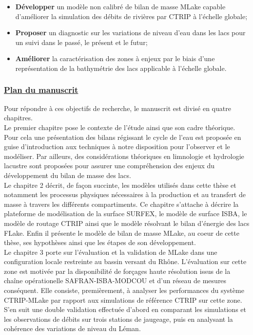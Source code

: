 \begin{itemize}
\item \textbf{Développer} un modèle non calibré de bilan de masse MLake capable d'améliorer la simulation des débits de rivières par CTRIP à l'échelle globale;\\

\item \textbf{Proposer} un diagnostic sur les variations de niveau d'eau dans les lacs pour un suivi dans le passé, le présent et le futur;\\

\item \textbf{Améliorer} la caractérisation des zones à enjeux par le biais d'une représentation de la bathymétrie des lacs applicable à l'échelle globale.\\
\end{itemize}

\subsubsection*{\underline{{\selectfont Plan du manuscrit}}}

\noindent Pour répondre à ces objectifs de recherche, le manuscrit est divisé en quatre chapitres. \\

Le premier chapitre pose le contexte de l'étude ainsi que son cadre théorique. Pour cela une présentation des bilans régissant le cycle de l'eau est proposée en guise d'introduction aux techniques à notre disposition pour l'observer et le modéliser. Par ailleurs, des considérations théoriques en limnologie et hydrologie lacustre sont proposées pour assurer une compréhension des enjeux du développement du bilan de masse des lacs. \\

Le chapitre 2 décrit, de façon succinte, les modèles utilisés dans cette thèse et notamment les processus physiques nécessaires à la production et au transfert de masse à travers les différents compartiments. Ce chapitre s'attache à décrire la plateforme de modélisation de la surface SURFEX, le modèle de surface ISBA, le modèle de routage CTRIP ainsi que le modèle résolvant le bilan d'énergie des lacs FLake. Enfin il présente le modèle de bilan de masse MLake, au coeur de cette thèse, ses hypothèses ainsi que les étapes de son développement. \\

Le chapitre 3 porte sur l'évaluation et la validation de MLake dans une configuration locale restreinte au bassin versant du Rhône. L'évaluation sur cette zone est motivée par la disponibilité de forçages haute résolution issus de la chaîne opérationelle SAFRAN-ISBA-MODCOU et d'un réseau de mesures conséquent. Elle consiste, premièrement, à analyser les performances du système CTRIP-MLake par rapport aux simulations de référence CTRIP sur cette zone. S'en suit une double validation effectuée d'abord en comparant les simulations et les observations de débits sur trois stations de jaugeage, puis en analysant la cohérence des variations de niveau du Léman. \\

